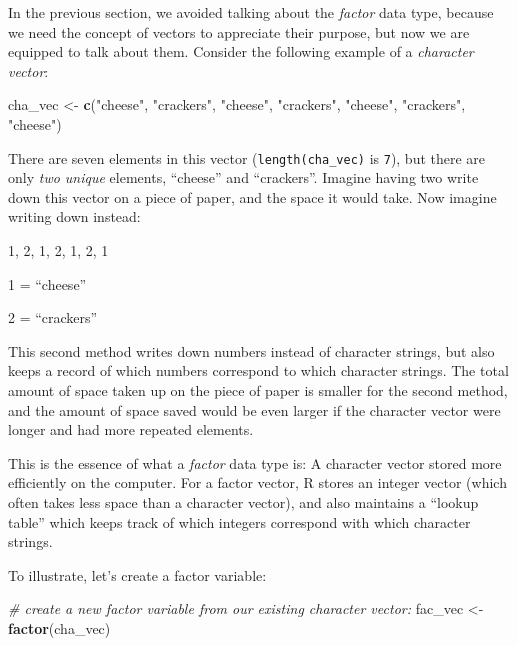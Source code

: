 \documentclass[
]{book}
\newenvironment{Shaded}{\begin{snugshade}}{\end{snugshade}}
\newcommand{\CommentTok}[1]{\textcolor[rgb]{0.56,0.35,0.01}{\textit{#1}}}
\newcommand{\KeywordTok}[1]{\textcolor[rgb]{0.13,0.29,0.53}{\textbf{#1}}}
\newcommand{\NormalTok}[1]{#1}
\newcommand{\StringTok}[1]{\textcolor[rgb]{0.31,0.60,0.02}{#1}}
\begin{document}
In the previous section, we avoided talking about the \emph{factor} data type, because we need the concept of vectors to appreciate their purpose, but now we are equipped to talk about them.
Consider the following example of a \emph{character vector}:

\begin{Shaded}
\begin{Highlighting}[]
\NormalTok{cha_vec <-}\StringTok{ }\KeywordTok{c}\NormalTok{(}\StringTok{"cheese"}\NormalTok{, }\StringTok{"crackers"}\NormalTok{, }\StringTok{"cheese"}\NormalTok{, }\StringTok{"crackers"}\NormalTok{, }\StringTok{"cheese"}\NormalTok{, }\StringTok{"crackers"}\NormalTok{, }\StringTok{"cheese"}\NormalTok{)}
\end{Highlighting}
\end{Shaded}

There are seven elements in this vector (\texttt{length(cha\_vec)} is \texttt{7}), but there are only \emph{two unique} elements, ``cheese'' and ``crackers''.
Imagine having two write down this vector on a piece of paper, and the space it would take.
Now imagine writing down instead:

1, 2, 1, 2, 1, 2, 1

1 = ``cheese''

2 = ``crackers''

This second method writes down numbers instead of character strings, but also keeps a record of which numbers correspond to which character strings.
The total amount of space taken up on the piece of paper is smaller for the second method, and the amount of space saved would be even larger if the character vector were longer and had more repeated elements.

This is the essence of what a \emph{factor} data type is: A character vector stored more efficiently on the computer.
For a factor vector, R stores an integer vector (which often takes less space than a character vector), and also maintains a ``lookup table'' which keeps track of which integers correspond with which character strings.

To illustrate, let's create a factor variable:

\begin{Shaded}
\begin{Highlighting}[]
\CommentTok{# create a new factor variable from our existing character vector:}
\NormalTok{fac_vec <-}\StringTok{ }\KeywordTok{factor}\NormalTok{(cha_vec)   }
\end{Highlighting}
\end{Shaded}
\end{document}
